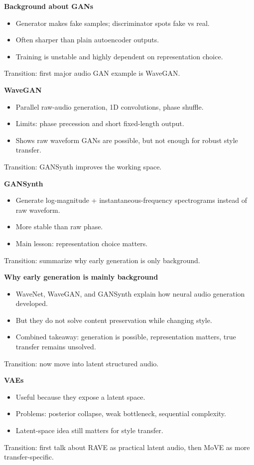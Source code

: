 \documentclass[11pt]{article}
\begin{document}
\textbf{Background about GANs}
\begin{itemize}
\item Generator makes fake samples; discriminator spots fake vs real.
\item Often sharper than plain autoencoder outputs.
\item Training is unstable and highly dependent on representation choice.
\end{itemize}
\textcolor{Muted}{Transition: first major audio GAN example is WaveGAN.}

\textbf{WaveGAN}
\begin{itemize}
\item Parallel raw-audio generation, 1D convolutions, phase shuffle.
\item Limits: phase precession and short fixed-length output.
\item Shows raw waveform GANs are possible, but not enough for robust style transfer.
\end{itemize}
\textcolor{Muted}{Transition: GANSynth improves the working space.}

\textbf{GANSynth}
\begin{itemize}
\item Generate log-magnitude + instantaneous-frequency spectrograms instead of raw waveform.
\item More stable than raw phase.
\item Main lesson: representation choice matters.
\end{itemize}
\textcolor{Muted}{Transition: summarize why early generation is only background.}

\textbf{Why early generation is mainly background}
\begin{itemize}
\item WaveNet, WaveGAN, and GANSynth explain how neural audio generation developed.
\item But they do not solve content preservation while changing style.
\item Combined takeaway: generation is possible, representation matters, true transfer remains unsolved.
\end{itemize}
\textcolor{Muted}{Transition: now move into latent structured audio.}

\textbf{VAEs}
\begin{itemize}
\item Useful because they expose a latent space.
\item Problems: posterior collapse, weak bottleneck, sequential complexity.
\item Latent-space idea still matters for style transfer.
\end{itemize}
\textcolor{Muted}{Transition: first talk about RAVE as practical latent audio, then MoVE as more transfer-specific.}
\end{document}
